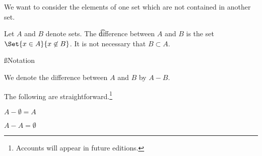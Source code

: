 

We want to consider the elements of one set which are not contained in another set.


Let $A$ and $B$ denote sets.
The \t{difference} between $A$ and $B$ is the set $\Set{x \in A}{x \not\in B}$.
It is not necessary that $B \subset A$.

\ss{Notation}

We denote the difference between $A$ and $B$ by $A - B$.


The following are straightforward.\footnote{Accounts will appear in future editions.}

\begin{proposition}
  $A - \emptyset = A$
\end{proposition}

\begin{proposition}
  $A - A = \emptyset$
\end{proposition}



\blankpage

